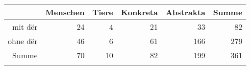 \begin{tabular}{rrrrrr}
  \lsptoprule
 & Menschen & Tiere & Konkreta & Abstrakta & Summe \\ 
  \midrule
mit dër & 24 & 4 & 21 & 33 & 82 \\ 
  ohne dër & 46 & 6 & 61 & 166 & 279 \\ 
  Summe & 70 & 10 & 82 & 199 & 361 \\ 
   \lspbottomrule
\end{tabular}
